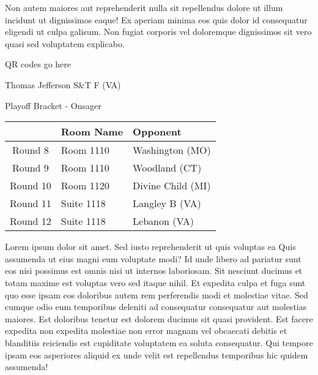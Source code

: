 \documentclass{article}%
\begin{document}
\newline%
Non autem maiores aut reprehenderit nulla sit repellendus dolore ut illum incidunt ut dignissimos eaque! Ex aperiam minima eos quis dolor id consequatur eligendi ut culpa galisum. Non fugiat corporis vel doloremque dignissimos sit vero quasi sed voluptatem explicabo.\newline%
\newline%
%
\vspace*{30pt}%
\begin{center}%
\begin{Huge}%
QR codes go here%
\end{Huge}%
\end{center}%
\newpage%
\begin{center}%
\begin{Huge}%
Thomas Jefferson S\&T F (VA)%
\end{Huge}%
\vspace*{8pt}%
\linebreak%
\begin{Large}%
Playoff Bracket {-} Onsager%
\end{Large}%
\end{center}%
\begin{tabularx}{\textwidth}{|c|Y|Y|}%
\hline%
&Room Name&Opponent\\%
\hline%
Round 8&Room 1110&Washington (MO)\\%
Round 9&Room 1110&Woodland (CT)\\%
Round 10&Room 1120&Divine Child (MI)\\%
Round 11&Suite 1118&Langley B (VA)\\%
Round 12&Suite 1118&Lebanon (VA)\\%
\hline%
\end{tabularx}%
\vspace*{8pt}%
\linebreak%
\newline%
\newline%
Lorem ipsum dolor sit amet. Sed iusto reprehenderit ut quis voluptas ea Quis assumenda ut eius magni eum voluptate modi? Id unde libero ad pariatur sunt eos nisi possimus est omnis nisi ut internos laboriosam. Sit nesciunt ducimus et totam maxime est voluptas vero sed itaque nihil. Et expedita culpa et fuga sunt quo esse ipsam eos doloribus autem rem perferendis modi et molestiae vitae.\newline%
\newline%
Sed cumque odio eum temporibus deleniti ad consequatur consequatur aut molestias maiores. Est doloribus tenetur est dolorem ducimus sit quasi provident. Est facere expedita non expedita molestiae non error magnam vel obcaecati debitis et blanditiis reiciendis est cupiditate voluptatem ea soluta consequatur. Qui tempore ipsam eos asperiores aliquid ex unde velit est repellendus temporibus hic quidem assumenda!\newline%
\end{document}
